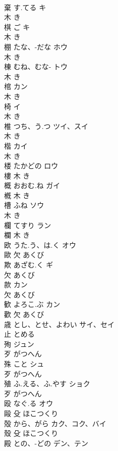 \documentclass[8pt]{extreport}
\begin{document}
\begin{CJK}{UTF8}{min}
\\	棄	す.てる	キ	
\\	木		き		
\\	棋	ご	キ	
\\	木		き		
\\	棚	たな、-だな	ホウ	
\\	木		き		
\\	棟	むね、むな-	トウ	
\\	木		き		
\\	棺		カン	
\\	木		き		
\\	椅		イ	
\\	木		き		
\\	椎	つち、う.つ	ツイ、スイ	
\\	木		き		
\\	楷		カイ	
\\	木		き		
\\	楼	たかどの	ロウ	
\\	樓	木		き		
\\	概	おおむ.ね	ガイ	
\\	槪	木		き		
\\	槽	ふね	ソウ	
\\	木		き		
\\	欄	てすり	ラン	
\\	欄	木		き		
\\	欧	うた.う、は.く	オウ	
\\	歐	欠		あくび		
\\	欺	あざむ.く	ギ	
\\	欠		あくび		
\\	款		カン	
\\	欠		あくび		
\\	歓	よろこ.ぶ	カン	
\\	歡	欠		あくび		
\\	歳	とし、とせ、よわい	サイ、セイ	
\\	止		とめる		
\\	殉		ジュン	
\\	歹		がつへん		
\\	殊	こと	シュ	
\\	歹		がつへん		
\\	殖	ふ.える、ふ.やす	ショク	
\\	歹		がつへん		
\\	殴	なぐ.る	オウ	
\\	毆	殳		ほこつくり		
\\	殻	から、がら	カク、コク、バイ	
\\	殼	殳		ほこつくり		
\\	殿	との、-どの	デン、テン	

\end{CJK}
\end{document}
